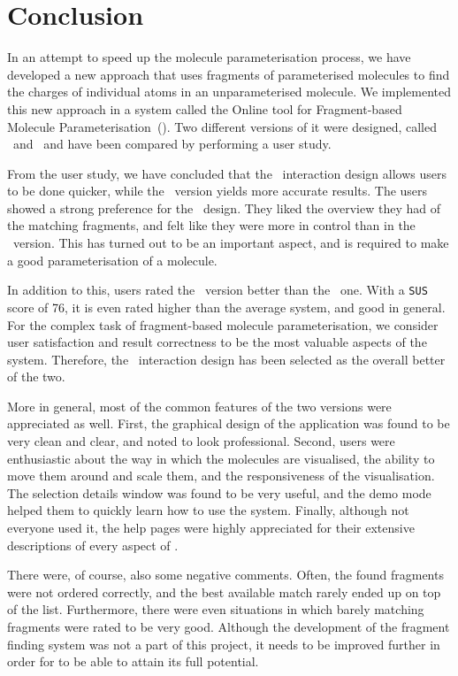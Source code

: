 \chapter{Conclusion}

In an attempt to speed up the molecule parameterisation process, we have developed a new approach that uses fragments of parameterised molecules to find the charges of individual atoms in an unparameterised molecule. We implemented this new approach in a system called the Online tool for Fragment-based Molecule Parameterisation~(\oframp). Two different versions of it were designed, called \IDa\ and \IDb\, and have been compared by performing a user study.

From the user study, we have concluded that the \IDb\ interaction design allows users to be done quicker, while the \IDa\ version yields more accurate results. The users showed a strong preference for the \IDa\ design. They liked the overview they had of the matching fragments, and felt like they were more in control than in the \IDb\ version. This has turned out to be an important aspect, and is required to make a good parameterisation of a molecule.

In addition to this, users rated the \IDa\ version better than the \IDb\ one. With a \verb|SUS| score of 76, it is even rated higher than the average system, and good in general. For the complex task of fragment-based molecule parameterisation, we consider user satisfaction and result correctness to be the most valuable aspects of the system. Therefore, the \IDa\ interaction design has been selected as the overall better of the two.

More in general, most of the common features of the two versions were appreciated as well. First, the graphical design of the application was found to be very clean and clear, and noted to look professional. Second, users were enthusiastic about the way in which the molecules are visualised, the ability to move them around and scale them, and the responsiveness of the visualisation. The selection details window was found to be very useful, and the demo mode helped them to quickly learn how to use the system. Finally, although not everyone used it, the help pages were highly appreciated for their extensive descriptions of every aspect of \oframp.

There were, of course, also some negative comments. Often, the found fragments were not ordered correctly, and the best available match rarely ended up on top of the list. Furthermore, there were even situations in which barely matching fragments were rated to be very good. Although the development of the fragment finding system was not a part of this project, it needs to be improved further in order for \oframp{} to be able to attain its full potential.

